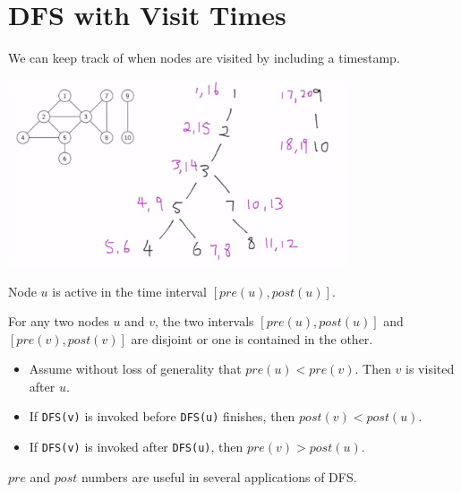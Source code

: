 \section{DFS with Visit Times}
\begin{itemize}
    \item We can keep track of when nodes are visited by including a timestamp.
    \item[] 
    \begin{center}
        \item[] \includegraphics[width=0.75\textwidth]{lecture17/images/undirected-dfs-tree-time.jpg}
    \end{center}
    \item Node $u$ is active in the time interval $[ pre(u), post(u) ]$.
    \item For any two nodes $u$ and $v$, the two intervals $[pre(u), post(u)]$ and $[pre(v), post(v)]$ are disjoint or one is contained in the other.
    \begin{itemize}
        \item Assume without loss of generality that $pre(u) < pre(v)$. Then $v$ is visited after $u$.
        \item If \texttt{DFS(v)} is invoked before \texttt{DFS(u)} finishes, then $post(v) < post(u)$.
        \item If \texttt{DFS(v)} is invoked after \texttt{DFS(u)}, then $pre(v) > post(u)$.
    \end{itemize}
    \item $pre$ and $post$ numbers are useful in several applications of DFS.
\end{itemize}

